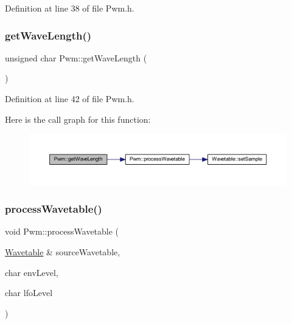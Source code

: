 Definition at line 38 of file Pwm.\+h.

\mbox{\label{class_pwm_a8d525e1a70c9a96c3a0ab4b0307da953}} 
\subsubsection{\texorpdfstring{get\+Wave\+Length()}{getWaveLength()}}
{\footnotesize\ttfamily unsigned char Pwm\+::get\+Wave\+Length (\begin{DoxyParamCaption}{ }\end{DoxyParamCaption})\hspace{0.3cm}{\ttfamily [inline]}}



Definition at line 42 of file Pwm.\+h.

Here is the call graph for this function\+:
\nopagebreak
\begin{figure}[H]
\begin{center}
\leavevmode
\includegraphics[width=350pt]{class_pwm_a8d525e1a70c9a96c3a0ab4b0307da953_cgraph}
\end{center}
\end{figure}
\mbox{\label{class_pwm_a51b2ea74a5b67115148141a843cddca1}} 
\subsubsection{\texorpdfstring{process\+Wavetable()}{processWavetable()}}
{\footnotesize\ttfamily void Pwm\+::process\+Wavetable (\begin{DoxyParamCaption}\item[{\hyperlink{class_wavetable}{Wavetable} \&}]{source\+Wavetable,  }\item[{char}]{env\+Level,  }\item[{char}]{lfo\+Level }\end{DoxyParamCaption})}



